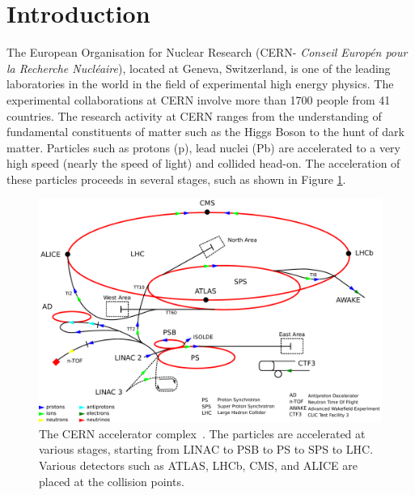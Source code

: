 \section{Introduction}
\label{s:secIntroLHC}
The European Organisation for Nuclear Research 
(CERN- \emph{Conseil Europ\'{e}n pour la Recherche Nucl\'{e}aire}), located at Geneva, 
Switzerland, is one of the leading laboratories in the world in the field of experimental 
high energy physics. The experimental collaborations at CERN involve more than 1700 people 
from 41 countries. The research activity at CERN ranges from the understanding of fundamental 
constituents of matter such as the Higgs Boson to the hunt of dark matter. Particles such as protons 
(p), lead nuclei (Pb) are accelerated to a very high speed (nearly the speed of light) and collided 
head-on. The acceleration of these particles proceeds in several stages, such as shown in Figure 
\ref{fig:lhc}.
\begin{figure}
  \begin{center}
  \includegraphics[width=0.80\linewidth]{Experiment/LHC/Image/cernacc.pdf}
  \caption{The CERN accelerator complex~\cite{wiki:cernAcc}. The particles are accelerated 
	at various stages, starting from LINAC to PSB to PS to SPS to LHC. Various detectors 
	such as ATLAS, LHCb, CMS, and ALICE are placed at the collision points.}
  \label{fig:lhc}
  \end{center}
\end{figure}


